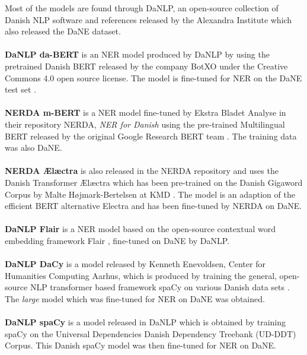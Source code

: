 \documentclass[main.tex]{subfiles}
\begin{document}
Most of the models are found through DaNLP\footnotemark, an open-source collection of Danish NLP software and references released by the Alexandra Institute which also released the DaNE dataset.
\\
\\
\textbf{DaNLP da-BERT}
is an NER model produced by DaNLP by using the pretrained Danish BERT released by the company BotXO \cite{botxo2019dabert} under the Creative Commons 4.0 open source license.
The model is fine-tuned for NER on the DaNE test set \cite{hvingelby2020dane}.\\
\\
\textbf{NERDA m-BERT}
is a NER model fine-tuned by Ekstra Bladet Analyse in their repository NERDA\footnotemark, \emph{NER for Danish} using the pre-trained Multilingual BERT released by the original Google Research BERT team \cite{devlin2019bert}.
The training data was also DaNE.
\\
\\
\textbf{NERDA Ælæctra}
is also released in the NERDA repository and uses the Danish Transformer Ælæctra which has been pre-trained on the Danish Gigaword Corpus by Malte Højmark-Bertelsen at KMD \cite{bertelsen2020lctra}.
The model is an adaption of the efficient BERT alternative Electra \cite{clark2020electra} and has been fine-tuned by NERDA on DaNE.\\
\\
\textbf{DaNLP Flair}
is a NER model based on the open-source contextual word embedding framework Flair \cite{akbik2019flair}, fine-tuned on DaNE by DaNLP.\\
\\
\textbf{DaNLP DaCy}
is a model released by Kenneth Enevoldsen, Center for Humanities Computing Aarhus, which is produced by training the general, open-source NLP transformer based framework spaCy \cite{honnibal2020spacy} on various Danish data sets \cite{enevoldsen2020dacy}.
The \emph{large} model which was fine-tuned for NER on DaNE was obtained.\\
\\
\textbf{DaNLP spaCy}
is a model released in DaNLP which is obtained by training spaCy \cite{honnibal2020spacy} on the Universal Dependencies Danish Dependency Treebank (UD-DDT) Corpus\cite{johann2015udddt}.
This Danish spaCy model was then fine-tuned for NER on DaNE.\\
\end{document}
